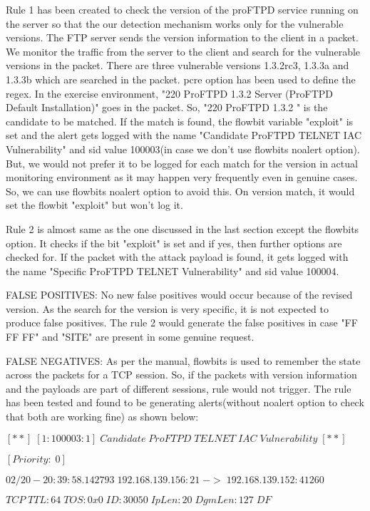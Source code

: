 \documentclass[11pt, pdftex]{article}
\begin{document}
\begin{enumerate}
Rule 1 has been created to check the version of the proFTPD service running on the server so that the our detection mechanism works only for the vulnerable versions. The FTP server sends the version information to the client in a packet. We monitor the traffic from the server to the client and search for the vulnerable versions in the packet. There are three vulnerable versions 1.3.2rc3, 1.3.3a and 1.3.3b which are searched in the packet. pcre option has been used to define the regex. In the exercise environment, "220 ProFTPD 1.3.2 Server (ProFTPD Default Installation)" goes in the packet. So, "220 ProFTPD 1.3.2 " is the candidate to be matched. If the match is found, the flowbit variable "exploit" is set and  the alert gets logged with the name "Candidate ProFTPD TELNET IAC Vulnerability" and sid value 100003(in case we don't use flowbits noalert option). But, we would not prefer it to be logged for each match for the version in actual monitoring environment as it may happen very frequently even in genuine cases. So, we can use flowbits noalert option to avoid this. On version match, it would set the flowbit "exploit" but won't log it. 

Rule 2 is almost same as the one discussed in the last section except the flowbits option. It checks if the bit "exploit" is set and if yes, then further options are checked for. If the packet with the attack payload is found, it gets logged with the name "Specific ProFTPD TELNET Vulnerability" and sid value 100004.

FALSE POSITIVES: No new false positives would occur because of the revised version. As the search for the version is very specific, it is not expected to produce false positives. The rule 2 would generate the false positives in case "FF FF FF" and "SITE" are present in some genuine request.

FALSE NEGATIVES: As per the manual, flowbits is used to remember the state across the packets for a TCP session. So, if the packets with version information and the payloads are part of different sessions, rule would not trigger. The rule has been tested and found to be generating alerts(without noalert option to check that both are working fine) as shown below: 

$[**]\; [1:100003:1]\; Candidate\; ProFTPD\; TELNET\; IAC\; Vulnerability\; [**]$

$[Priority:\; 0]$

$02/20-20:39:58.142793\; 192.168.139.156:21\; ->\; 192.168.139.152:41260$

$TCP\; TTL:64\; TOS:0x0\; ID:30050\; IpLen:20\; DgmLen:127\; DF$


\end{enumerate}
\end{document}
